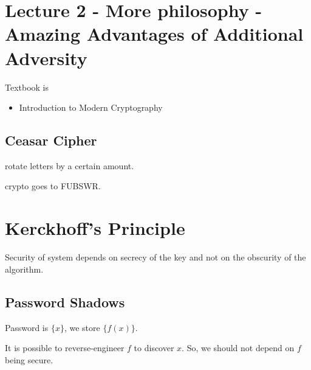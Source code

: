 \documentclass{article}
\begin{document}
\section{Lecture 2 - More philosophy - Amazing Advantages of Additional Adversity}

Textbook is
\begin{itemize}
    \item Introduction to Modern Cryptography
\end{itemize}

\subsection{Ceasar Cipher}

rotate letters by a certain amount.

crypto goes to FUBSWR.

\section{Kerckhoff's Principle}
Security of system depends on secrecy of the key and not on the
obscurity of the algorithm.

\subsection{Password Shadows}
Password is $\{x\}$, we store $\{ f(x) \}$.

It is possible to reverse-engineer $f$ to discover $x$. So, we should not depend
on $f$ being secure.

\subsection{}
\end{document}
